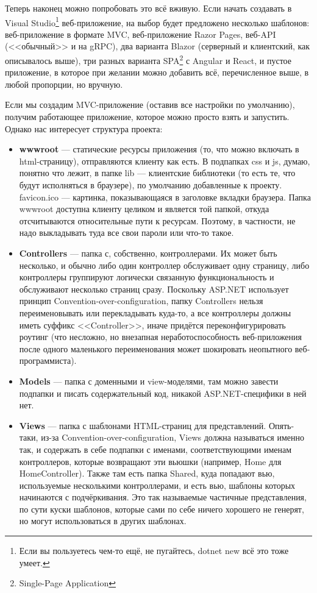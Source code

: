\documentclass[a5paper]{article}
\begin{document}
Теперь наконец можно попробовать это всё вживую. Если начать создавать в Visual Studio\footnote{Если вы пользуетесь чем-то ещё, не пугайтесь, dotnet new всё это тоже умеет.} веб-приложение, на выбор будет предложено несколько шаблонов: веб-приложение в формате MVC, веб-приложение Razor Pages, веб-API (<<обычный>> и на gRPC), два варианта Blazor (серверный и клиентский, как описывалось выше), три разных варианта SPA\footnote{Single-Page Application} с Angular и React, и пустое приложение, в которое при желании можно добавить всё, перечисленное выше, в любой пропорции, но вручную.

Если мы создадим MVC-приложение (оставив все настройки по умолчанию), получим работающее приложение, которое можно просто взять и запустить. Однако нас интересует структура проекта:

\begin{itemize}
    \item \textbf{wwwroot} --- статические ресурсы приложения (то, что можно включать в html-страницу), отправляются клиенту как есть. В подпапках css и js, думаю, понятно что лежит, в папке lib --- клиентские библиотеки (то есть те, что будут исполняться в браузере), по умолчанию добавленные к проекту. favicon.ico --- картинка, показывающаяся в заголовке вкладки браузера. Папка wwwroot доступна клиенту целиком и является той папкой, откуда отсчитываются относительные пути к ресурсам. Поэтому, в частности, не надо выкладывать туда все свои пароли или что-то такое.
    \item \textbf{Controllers} --- папка с, собственно, контроллерами. Их может быть несколько, и обычно либо один контроллер обслуживает одну страницу, либо контроллеры группируют логически связанную функциональность и обслуживают несколько страниц сразу. Поскольку ASP.NET использует принцип Convention-over-configuration, папку Controllers нельзя переименовывать или перекладывать куда-то, а все контроллеры должны иметь суффикс <<Controller>>, иначе придётся переконфигурировать роутинг (что несложно, но внезапная неработоспособность веб-приложения после одного маленького переименования может шокировать неопытного веб-программиста).
    \item \textbf{Models} --- папка с доменными и view-моделями, там можно завести подпапки и писать содержательный код, никакой ASP.NET-специфики в ней нет.
    \item \textbf{Views} --- папка с шаблонами HTML-страниц для представлений. Опять-таки, из-за Convention-over-configuration, Views должна называться именно так, и содержать в себе подпапки с именами, соответствующими именам контроллеров, которые возвращают эти вьюшки (например, Home для HomeController). Также там есть папка Shared, куда попадают вью, используемые несколькими контроллерами, и есть вью, шаблоны которых начинаются с подчёркивания. Это так называемые частичные представления, по сути куски шаблонов, которые сами по себе ничего хорошего не генерят, но могут использоваться в других шаблонах.

\end{itemize}
\end{document}
